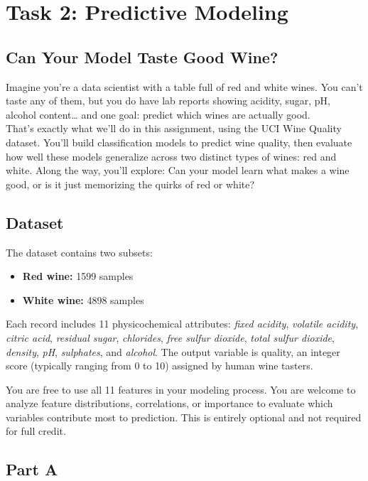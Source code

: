\documentclass[11pt]{article}
\begin{document}
\section*{Task 2: Predictive Modeling}
\subsection*{Can Your Model Taste Good Wine?}

Imagine you're a data scientist with a table full of red and white wines. You can’t taste any of them, but you do have lab reports showing acidity, sugar, pH, alcohol content… and one goal: predict which wines are actually good. \\

\noindent That’s exactly what we’ll do in this assignment, using the UCI Wine Quality dataset. You’ll build classification models to predict wine quality, then evaluate how well these models generalize across two distinct types of wines: red and white. Along the way, you’ll explore: Can your model learn what makes a wine good, or is it just memorizing the quirks of red or white?

\subsection*{Dataset}
The dataset contains two subsets:
\begin{itemize}
    \item \textbf{Red wine:} 1599 samples
    \item \textbf{White wine:} 4898 samples
\end{itemize}

\noindent Each record includes 11 physicochemical attributes:
\emph{fixed acidity}, \emph{volatile acidity}, \emph{citric acid}, \emph{residual sugar}, \emph{chlorides}, \emph{free sulfur dioxide}, \emph{total sulfur dioxide}, \emph{density}, \emph{pH}, \emph{sulphates}, and \emph{alcohol}. The output variable is quality, an integer score (typically ranging from 0 to 10) assigned by human wine tasters. 

\noindent You are free to use all 11 features in your modeling process. You are welcome to analyze feature distributions, correlations, or importance to evaluate which variables contribute most to prediction. This is entirely optional and not required for full credit. 

\subsection*{Part A}
\end{document}
